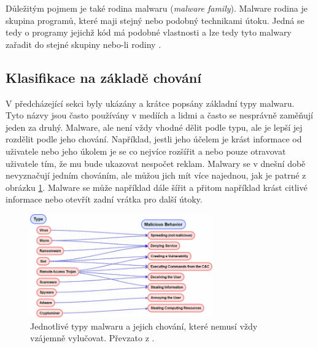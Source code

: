 \label{family}Důležitým pojmem je také rodina malwaru (\textit{malware family}). Malware rodina je skupina programů, které maji stejný nebo podobný technikami útoku. Jedná se tedy o programy jejichž kód má podobné vlastnosti a lze tedy tyto malwary zařadit do stejné skupiny nebo-li rodiny \cite{malware_fam}. 

\subsection*{Klasifikace na základě chování}
V předcházející sekci byly ukázány a krátce popsány základní typy malwaru. Tyto názvy jsou často používány v medíích a lidmi a často se nesprávně zaměňují jeden za druhý.
Malware, ale není vždy vhodné dělit podle typu, ale je lepší jej rozdělit podle jeho chování. Například, jestli jeho účelem je krást informace od uživatele nebo jeho úkolem je se 
co nejvíce rozšířit a nebo pouze otravovat uživatele tím, že mu bude ukazovat nespočet reklam. Malwary se v dnešní době nevyznačují jedním chováním, ale můžou jich mít více najednou, jak 
je patrné z obrázku \ref{behavior}. Malware se může například dále šířit a přitom například krást citlivé informace nebo otevřít zadní vrátka pro další útoky. 

\begin{figure}[h]
	\centering
        \includegraphics[width=0.7\textwidth]{obrazky/behavior.png}
	\caption{Jednotlivé typy malwaru a jejich chování, které nemusí vždy vzájemně vylučovat. Převzato z \cite{article_malware}.}
    \label{behavior}
\end{figure}
\newpage

